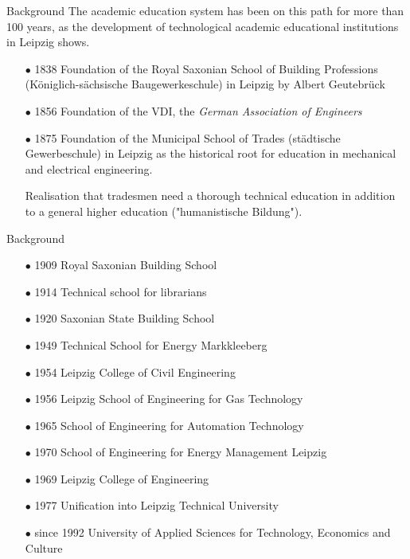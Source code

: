\documentclass{beamer}
\begin{document}
\begin{frame}{Background}
The academic education system has been on this path for more than 100 years,
as the development of technological academic educational institutions in
Leipzig shows.
\begin{itemize}
\item[$\bullet$] 1838 Foundation of the Royal Saxonian School of Building
  Professions (K\"oniglich-sächsische Baugewerkeschule) in Leipzig by Albert
  Geutebrück
\item [$\bullet$] 1856 Foundation of the VDI, the \emph{German Association of
  Engineers} 
\item[$\bullet$] 1875 Foundation of the Municipal School of Trades
  (st\"adtische Gewerbeschule) in Leipzig as the historical root for education
  in mechanical and electrical engineering.\medskip

  Realisation that tradesmen need a thorough technical education in addition
  to a general higher education ("humanistische Bildung").
\end{itemize}
\end{frame}

\begin{frame}{Background}
\begin{itemize}
\item[$\bullet$] 1909 Royal Saxonian Building School
\item[$\bullet$] 1914 Technical school for librarians
\item[$\bullet$] 1920 Saxonian State Building School
\item[$\bullet$] 1949 Technical School for Energy Markkleeberg
\item[$\bullet$] 1954 Leipzig College of Civil Engineering
\item[$\bullet$] 1956 Leipzig School of Engineering for Gas Technology
\item[$\bullet$] 1965 School of Engineering for Automation Technology
\item[$\bullet$] 1970 School of Engineering for Energy Management Leipzig
\item[$\bullet$] 1969 Leipzig College of Engineering
\item[$\bullet$] 1977 Unification into Leipzig Technical University
\item[$\bullet$] since 1992 University of Applied Sciences for Technology,
  Economics and Culture
\end{itemize}
\end{frame}
\end{document}

